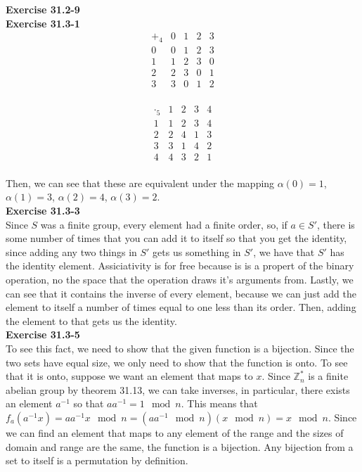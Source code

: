 \documentclass{article}
\newcommand{\Z}{\mathbb{Z}}
\begin{document}
\noindent\textbf{Exercise 31.2-9}\\



\noindent\textbf{Exercise 31.3-1}\\

\[
\begin{array}{c|cccc}
+_4&0&1&2&3\\
\hline
0&0&1&2&3\\
1&1&2&3&0\\
2&2&3&0&1\\
3&3&0&1&2\\
\end{array}
\]

\[
\begin{array}{c|cccc}
\cdot_5&1&2&3&4\\
\hline
1&1&2&3&4\\
2&2&4&1&3\\
3&3&1&4&2\\
4&4&3&2&1\\
\end{array}
\]

Then, we can see that these are equivalent under the mapping $\alpha(0) =1$, $\alpha(1)= 3$, $\alpha(2) = 4$, $\alpha(3) =2$.\\



\noindent\textbf{Exercise 31.3-3}\\

Since $S$ was a finite group, every element had a finite order, so, if $a\in S'$, there is some number of times that you can add it to itself so that you get the identity, since adding any two things in $S'$ gets us something in $S'$, we have that $S'$ has the identity element. Assiciativity is for free because is is a propert of the binary operation, no the space that the operation draws it's arguments from. Lastly, we can see that it contains the inverse of every element, because we can just add the element to itself a number of times equal to one less than its order. Then, adding the element to that gets us the identity.\\



\noindent\textbf{Exercise 31.3-5}\\
To see this fact, we need to show that the given function is a bijection. Since the two sets have equal size, we only need to show that the function is onto. To see that it is onto, suppose we want an element that maps to $x$. Since $\Z_n^*$ is a finite abelian group by theorem 31.13, we can take inverses, in particular, there exists an element $a^{-1}$ so that $a a^{-1} = 1 \mod n$. This means that $f_a(a^{-1} x) =a a^{-1} x \mod n = (a a^{-1} \mod n) (x \mod n) = x \mod n$. Since we can find an element that maps to any element of the range and the sizes of domain and range are the same, the function is a bijection. Any bijection from a set to itself is a permutation by definition.\\
\end{document}
